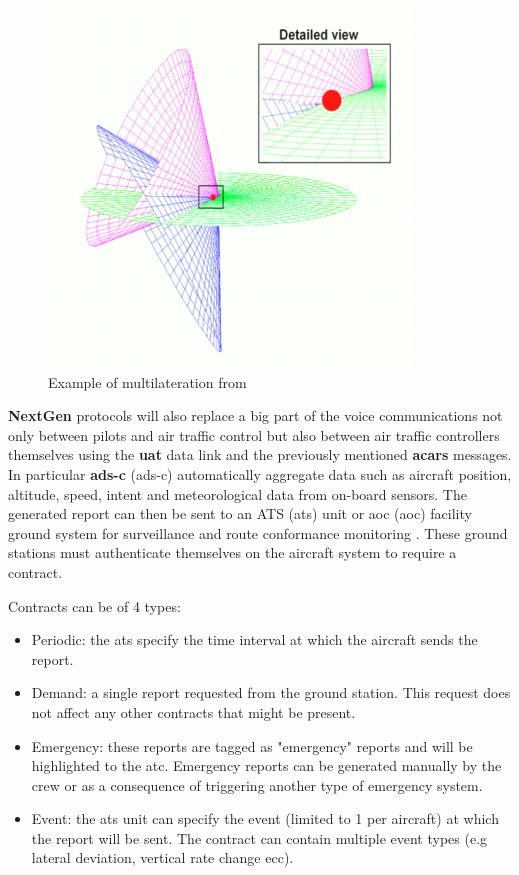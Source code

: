 \documentclass[../main.tex]{subfiles}
\begin{document}
\begin{figure}[htp]
  \centering
  \includegraphics{images/mlat.png}
  \caption{Example of multilateration from \cite{Strohmeier2013}}
  \label{fig:mlat}
\end{figure}

\textbf{NextGen} protocols will also replace a big part of the voice communications not only between pilots and air traffic control but also between air traffic controllers themselves using the \textbf{\acrshort{uat}} data link and the previously mentioned \textbf{\acrshort{acars}} messages.
In particular \textbf{\acrshort{ads-c}} (\acrlong{ads-c}) automatically aggregate data such as aircraft position, altitude, speed, intent and meteorological data from on-board sensors. The generated report can then be sent to an ATS (\acrlong{ats}) unit or \acrshort{aoc} (\acrlong{aoc}) facility ground system for surveillance and route conformance monitoring \cite{goldman}. These ground stations must authenticate themselves on the aircraft system to require a contract.

Contracts can be of 4 types:

\begin{itemize}
  \item Periodic: the \acrshort{ats} specify the time interval at which the aircraft sends the report.
  \item Demand: a single report requested from the ground station. This request does not affect any other contracts that might be present.
  \item Emergency: these reports are tagged as "emergency" reports and will be highlighted to the \acrshort{atc}. Emergency reports can be generated manually by the crew or as a consequence of triggering another type of emergency system.
  \item Event: the \acrshort{ats} unit can specify the event (limited to 1 per aircraft) at which the report will be sent. The contract can contain multiple event types (e.g lateral deviation, vertical rate change ecc).
\end{itemize}
\end{document}
